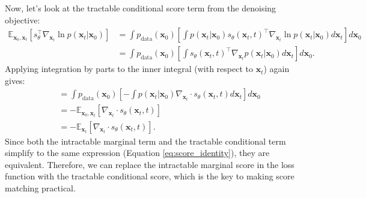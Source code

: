 \documentclass{article}
\begin{document}
Now, let's look at the tractable conditional score term from the denoising objective:
\begin{align*}
\mathbb{E}_{\mathbf{x}_0, \mathbf{x}_t}[s_\theta^\top \nabla_{\mathbf{x}_t} \ln p(\mathbf{x}_t | \mathbf{x}_0)] &= \int p_{\text{data}}(\mathbf{x}_0) \left[ \int p(\mathbf{x}_t|\mathbf{x}_0) s_\theta(\mathbf{x}_t, t)^\top \nabla_{\mathbf{x}_t} \ln p(\mathbf{x}_t|\mathbf{x}_0) d\mathbf{x}_t \right] d\mathbf{x}_0 \\
&= \int p_{\text{data}}(\mathbf{x}_0) \left[ \int s_\theta(\mathbf{x}_t, t)^\top \nabla_{\mathbf{x}_t} p(\mathbf{x}_t|\mathbf{x}_0) d\mathbf{x}_t \right] d\mathbf{x}_0.
\end{align*}
Applying integration by parts to the inner integral (with respect to $\mathbf{x}_t$) again gives:
\begin{align*}
&= \int p_{\text{data}}(\mathbf{x}_0) \left[ -\int p(\mathbf{x}_t|\mathbf{x}_0) \nabla_{\mathbf{x}_t} \cdot s_\theta(\mathbf{x}_t, t) d\mathbf{x}_t \right] d\mathbf{x}_0 \\
&= -\mathbb{E}_{\mathbf{x}_0, \mathbf{x}_t}[\nabla_{\mathbf{x}_t} \cdot s_\theta(\mathbf{x}_t, t)] \\
&= -\mathbb{E}_{\mathbf{x}_t}[\nabla_{\mathbf{x}_t} \cdot s_\theta(\mathbf{x}_t, t)].
\end{align*}
Since both the intractable marginal term and the tractable conditional term simplify to the same expression (Equation \ref{eq:score_identity}), they are equivalent. Therefore, we can replace the intractable marginal score in the loss function with the tractable conditional score, which is the key to making score matching practical.
\end{document}
